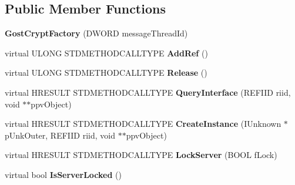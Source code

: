 \subsection*{Public Member Functions}
\begin{DoxyCompactItemize}
\item 
\mbox{\label{class_gost_crypt_factory_ad1c8239cc0d59b56f1a5ce3299d2ecd0}} 
{\bfseries Gost\+Crypt\+Factory} (D\+W\+O\+RD message\+Thread\+Id)
\item 
\mbox{\label{class_gost_crypt_factory_af98e1bb896038dcdc2cc98706db0db21}} 
virtual U\+L\+O\+NG S\+T\+D\+M\+E\+T\+H\+O\+D\+C\+A\+L\+L\+T\+Y\+PE {\bfseries Add\+Ref} ()
\item 
\mbox{\label{class_gost_crypt_factory_a58a667db1e9a793e3707abfe6bef7256}} 
virtual U\+L\+O\+NG S\+T\+D\+M\+E\+T\+H\+O\+D\+C\+A\+L\+L\+T\+Y\+PE {\bfseries Release} ()
\item 
\mbox{\label{class_gost_crypt_factory_a9c97bb47b41fdeb222cf72aa8126847c}} 
virtual H\+R\+E\+S\+U\+LT S\+T\+D\+M\+E\+T\+H\+O\+D\+C\+A\+L\+L\+T\+Y\+PE {\bfseries Query\+Interface} (R\+E\+F\+I\+ID riid, void $\ast$$\ast$ppv\+Object)
\item 
\mbox{\label{class_gost_crypt_factory_aaf390a8faa8b9c2e8d1b3686c9204414}} 
virtual H\+R\+E\+S\+U\+LT S\+T\+D\+M\+E\+T\+H\+O\+D\+C\+A\+L\+L\+T\+Y\+PE {\bfseries Create\+Instance} (I\+Unknown $\ast$p\+Unk\+Outer, R\+E\+F\+I\+ID riid, void $\ast$$\ast$ppv\+Object)
\item 
\mbox{\label{class_gost_crypt_factory_a06c89ac0b1ba2b61b2b87e88af9b7b25}} 
virtual H\+R\+E\+S\+U\+LT S\+T\+D\+M\+E\+T\+H\+O\+D\+C\+A\+L\+L\+T\+Y\+PE {\bfseries Lock\+Server} (B\+O\+OL f\+Lock)
\item 
\mbox{\label{class_gost_crypt_factory_a6a816bcf5734ba0cd28654210e2a1acf}} 
virtual bool {\bfseries Is\+Server\+Locked} ()
\end{DoxyCompactItemize}
